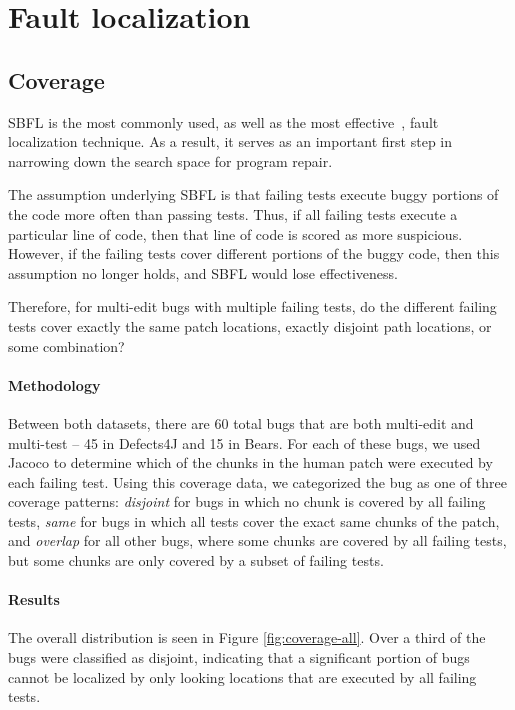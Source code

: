 \section{Fault localization}


\subsection{Coverage}


SBFL is the most commonly used, as well as the most effective~\cite{zou2019empirical}, fault 
localization technique. As a result, it serves as an important first step in narrowing down the search 
space for program repair.

The assumption underlying SBFL is that failing tests execute buggy portions of 
the code more often than passing tests. Thus, if all failing tests execute a particular 
line of code, then that line of code is scored as more suspicious. However, if the 
failing tests cover different portions of the buggy code, then this assumption 
no longer holds, and SBFL would lose effectiveness.

Therefore, for multi-edit bugs with multiple failing tests, do the different failing tests cover exactly the 
same patch locations, exactly disjoint path locations, or some combination?

\paragraph{Methodology}

Between both datasets, there are 60 total bugs that are both multi-edit and 
multi-test -- 45 in Defects4J and 15 in Bears. For each of these bugs, we used 
Jacoco to determine which of the chunks in the human patch were executed by each failing test. Using 
this coverage data, we categorized the bug as one of 
three coverage patterns: \textit{disjoint} for bugs in which no chunk is covered by all failing tests, 
\textit{same} for bugs in which all 
tests cover the exact same chunks of the patch, and \textit{overlap} for all 
other bugs, where some chunks are covered by all failing tests, but some chunks are only covered by a 
subset of failing tests.

\paragraph{Results}
The overall distribution is seen in Figure \ref{fig:coverage-all}. Over a third of the bugs were classified as 
disjoint, indicating that a significant portion of 
bugs cannot be localized by only looking locations that are executed by all failing tests.

